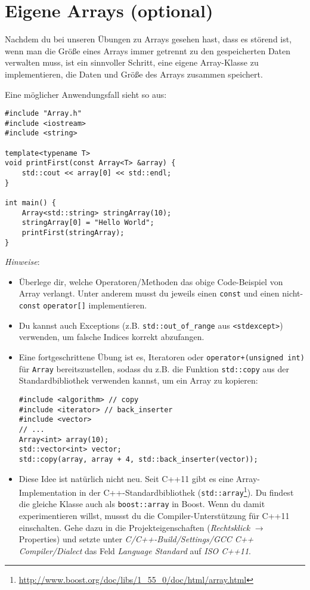 \section{Eigene Arrays (optional)}
\label{sec:array}

Nachdem du bei unseren Übungen zu Arrays gesehen hast, dass es störend ist, wenn man die Größe eines Arrays immer getrennt zu den gespeicherten Daten verwalten muss, ist ein sinnvoller Schritt, eine eigene Array-Klasse zu implementieren, die Daten und Größe des Arrays zusammen speichert.

Eine möglicher Anwendungsfall sieht so aus:

\begin{lstlisting}
#include "Array.h"
#include <iostream>
#include <string>

template<typename T>
void printFirst(const Array<T> &array) {
    std::cout << array[0] << std::endl;
}

int main() {
    Array<std::string> stringArray(10);
    stringArray[0] = "Hello World";
    printFirst(stringArray);
}
\end{lstlisting}

\emph{Hinweise}:
\begin{itemize}
\item
Überlege dir, welche Operatoren/Methoden das obige Code-Beispiel von Array verlangt.
Unter anderem musst du jeweils einen \texttt{const} und einen nicht-\texttt{const} \texttt{operator[]} implementieren.

\item
Du kannst auch Exceptions (z.B. \texttt{std::out\_of\_range} aus \texttt{<stdexcept>}) verwenden, um falsche Indices korrekt abzufangen.

\item
Eine fortgeschrittene Übung ist es, Iteratoren oder \texttt{operator+(unsigned int)} für \lstinline|Array| bereitszustellen, sodass du z.B. die Funktion \texttt{std::copy} aus der Standardbibliothek verwenden kannst, um ein Array zu kopieren:
\begin{lstlisting}
#include <algorithm> // copy
#include <iterator> // back_inserter
#include <vector>
// ...
Array<int> array(10);
std::vector<int> vector;
std::copy(array, array + 4, std::back_inserter(vector));
\end{lstlisting}

\item
{}
Diese Idee ist natürlich nicht neu.
Seit C++11 gibt es eine Array-Implementation in der C++-Standardbibliothek (\texttt{std::array}\footnote{\url{http://www.boost.org/doc/libs/1_55_0/doc/html/array.html}}).
Du findest die gleiche Klasse auch als \texttt{boost::array} in Boost.
Wenn du damit experimentieren willst, mussst du die Compiler-Unterstützung für C++11 einschalten.
Gehe dazu in die Projekteigenschaften (\emph{Rechtsklick} $\to$ Properties) und setzte unter \emph{C/C++-Build/Settings/GCC C++ Compiler/Dialect} das Feld \emph{Language Standard} auf \emph{ISO C++11}.
\end{itemize}
